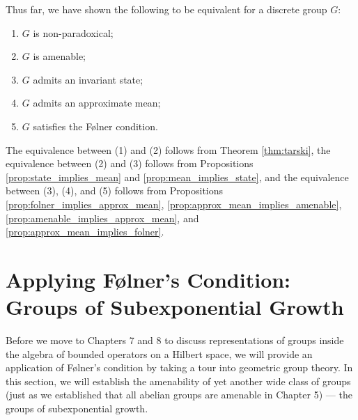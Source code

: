 Thus far, we have shown the following to be equivalent for a discrete group $G$:
\begin{enumerate}[(1)]
  \item $G$ is non-paradoxical;
  \item $G$ is amenable;
  \item $G$ admits an invariant state;
  \item $G$ admits an approximate mean;
  \item $G$ satisfies the Følner condition.
\end{enumerate}
The equivalence between (1) and (2) follows from Theorem \ref{thm:tarski}, the equivalence between (2) and (3) follows from Propositions \ref{prop:state_implies_mean} and \ref{prop:mean_implies_state}, and the equivalence between (3), (4), and (5) follows from Propositions \ref{prop:folner_implies_approx_mean}, \ref{prop:approx_mean_implies_amenable}, \ref{prop:amenable_implies_approx_mean}, and \ref{prop:approx_mean_implies_folner}.
\section{Applying Følner's Condition: Groups of Subexponential Growth}%
Before we move to Chapters 7 and 8 to discuss representations of groups inside the algebra of bounded operators on a Hilbert space, we will provide an application of Følner's condition by taking a tour into geometric group theory. In this section, we will establish the amenability of yet another wide class of groups (just as we established that all abelian groups are amenable in Chapter 5) --- the groups of subexponential growth.\newline

